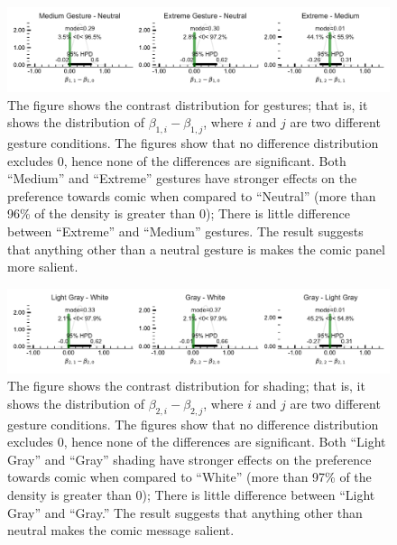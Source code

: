 \begin{figure}
 \includegraphics[width=\textwidth]{./hari-code/factors_gesture_contrasts_main-noint.pdf}
 \caption{The figure shows the contrast distribution for gestures; that is, it shows the distribution of $\beta_{1,i} - \beta_{1,j}$, where $i$ and $j$ are two different gesture conditions. The figures show that no difference distribution excludes $0$, hence none of the differences are significant. Both ``Medium'' and ``Extreme'' gestures have stronger effects on the preference towards comic when compared to ``Neutral'' (more than 96\% of the density is greater than 0); There is little difference between ``Extreme'' and ``Medium'' gestures. The result suggests that anything other than a neutral gesture is makes the comic panel more salient.}
 \label{fig:gesture-contrasts-main}
\end{figure}

\begin{figure}
 \includegraphics[width=\textwidth]{./hari-code/factors_shading_contrasts_main-noint.pdf}
 \caption{The figure shows the contrast distribution for shading; that is, it shows the distribution of $\beta_{2,i} - \beta_{2,j}$, where $i$ and $j$ are two different gesture conditions. The figures show that no difference distribution excludes $0$, hence none of the differences are significant. Both ``Light Gray'' and ``Gray'' shading have stronger effects on the preference towards comic when compared to ``White'' (more than 97\% of the density is greater than 0); There is little difference between ``Light Gray'' and ``Gray.'' The result suggests that anything other than neutral makes the comic message salient.}
 \label{fig:shading-contrasts-main}
\end{figure}


